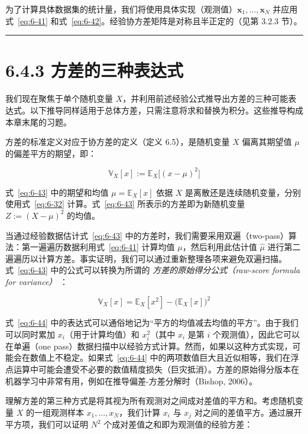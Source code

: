 为了计算具体数据集的统计量，我们将使用具体实现（观测值）$ \boldsymbol{x}_1, \ldots, \boldsymbol{x}_N $ 并应用式~\eqref{eq:6-41} 和式~\eqref{eq:6-42}。经验协方差矩阵是对称且半正定的（见第 3.2.3 节）。

\medskip\hrule\medskip

\section*{6.4.3 方差的三种表达式}

我们现在聚焦于单个随机变量 $ X $，并利用前述经验公式推导出方差的三种可能表达式。以下推导同样适用于总体方差，只需注意将求和替换为积分。这些推导构成本章末尾的习题。

方差的标准定义对应于协方差的定义（定义 6.5），是随机变量 $ X $ 偏离其期望值 $ \mu $ 的偏差平方的期望，即：

\begin{equation}
\mathbb{V}_X[x] := \mathbb{E}_X\big[(x - \mu)^2\big]
\tag{6.43}\label{eq:6-43}
\end{equation}

式~\eqref{eq:6-43} 中的期望和均值 $ \mu = \mathbb{E}_X[x] $ 依据 $ X $ 是离散还是连续随机变量，分别使用式~\eqref{eq:6-32} 计算。式~\eqref{eq:6-43} 所表示的方差即为新随机变量 $ Z := (X - \mu)^2 $ 的均值。

当通过经验数据估计式~\eqref{eq:6-43} 中的方差时，我们需要采用双遍（two-pass）算法：第一遍遍历数据利用式~\eqref{eq:6-41} 计算均值 $ \mu $，然后利用此估计值 $ \hat{\mu} $ 进行第二遍遍历以计算方差。事实证明，我们可以通过重新整理各项来避免双遍扫描。式~\eqref{eq:6-43} 中的公式可以转换为所谓的 \emph{方差的原始得分公式（raw-score formula for variance）} ：

\begin{equation}
\mathbb{V}_X[x] = \mathbb{E}_X[x^2] - \big(\mathbb{E}_X[x]\big)^2
\tag{6.44}\label{eq:6-44}
\end{equation}

式~\eqref{eq:6-44} 中的表达式可以通俗地记为“平方的均值减去均值的平方”。由于我们可以同时累加 $ x_i $（用于计算均值）和 $ x_i^2 $（其中 $ x_i $ 是第 $ i $ 个观测值），因此它可以在单遍（one pass）数据扫描中以经验方式计算。然而，如果以这种方式实现，可能会在数值上不稳定。如果式~\eqref{eq:6-44} 中的两项数值巨大且近似相等，我们在浮点运算中可能会遭受不必要的数值精度损失（巨灾抵消）。方差的原始得分版本在机器学习中非常有用，例如在推导偏差-方差分解时（Bishop, 2006）。

理解方差的第三种方式是将其视为所有观测对之间成对差值的平方和。考虑随机变量 $ X $ 的一组观测样本 $ x_1, \ldots, x_N $，我们计算 $ x_i $ 与 $ x_j $ 对之间的差值平方。通过展开平方项，我们可以证明 $ N^2 $ 个成对差值之和即为观测值的经验方差：

